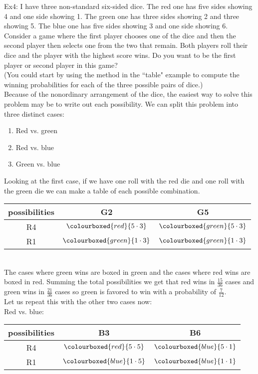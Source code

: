 Ex4: I have three non-standard six-sided dice. The red one has five sides showing 4 and one side showing 1. The green one has three sides showing 2 and three showing 5. The blue one has five sides showing 3 and one side showing 6.\\
Consider a game where the first player chooses one of the dice and then the second player then selects one from the two that remain. Both players roll their dice and the player with the highest score wins. Do you want to be the first player or second player in this game?\\
(You could start by using the method in the ``table" example to compute the winning probabilities for each of the three possible pairs of dice.)\\

Because of the nonordinary arrangement of the dice, the easiest way to solve this problem may be to write out each possibility. We can split this problem into three distinct cases:
\begin{enumerate}
    \item Red vs. green
    \item Red vs. blue
    \item Green vs. blue
\end{enumerate}
Looking at the first case, if we have one roll with the red die and one roll with the green die we can make a table of each possible combination.\\
\begin{tabular}{c|cc}
possibilities & G2 & G5\\
\hline
R4 & $\colourboxed{red}{5\cdot3}$ & $\colourboxed{green}{5\cdot3}$\\
R1 & $\colourboxed{green}{1\cdot3}$ & $\colourboxed{green}{1\cdot3}$
\end{tabular}\\
The cases where green wins are boxed in green and the cases where red wins are boxed in red.
Summing the total possibilities we get that red wins in $\frac{15}{36}$ cases and green wins in $\frac{21}{36}$ cases so green is favored to win with a probability of $\frac{7}{12}$.\\
Let us repeat this with the other two cases now:\\
Red vs. blue:\\
\begin{tabular}{c|cc}
possibilities & B3 & B6\\
\hline
R4 & $\colourboxed{red}{5\cdot5}$ & $\colourboxed{blue}{5\cdot1}$\\
R1 & $\colourboxed{blue}{1\cdot5}$ & $\colourboxed{blue}{1\cdot1}$
\end{tabular}\\

